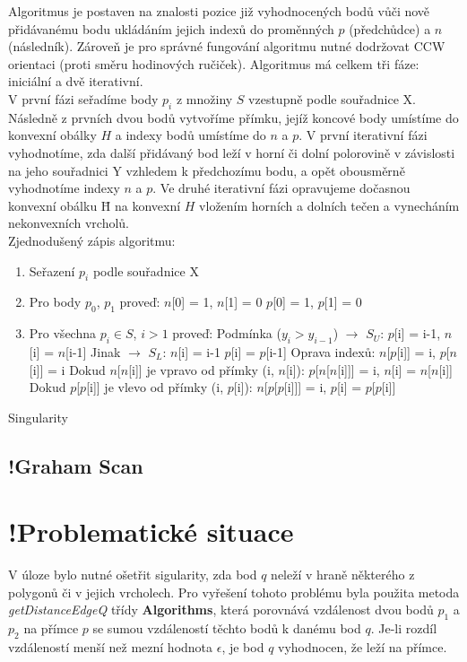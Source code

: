 \documentclass[a4paper, 12pt]{article}
\begin{document}
Algoritmus je postaven na znalosti pozice již vyhodnocených bodů vůči nově přidá\-vanému bodu ukládáním jejich indexů do proměnných $p$ (předchůdce) a $n$ (následník). Zároveň je pro správné fungování algoritmu nutné dodržovat CCW orientaci (proti směru hodinových ručiček). Algoritmus má celkem tři fáze: iniciální a dvě iterativní.\\

V první fázi seřadíme body $p_i$ z množiny $S$ vzestupně podle souřadnice X. Následně z prvních dvou bodů vytvoříme přímku, jejíž koncové body umístíme do konvexní obálky $H$ a indexy bodů umístíme do $n$ a $p$. V první iterativní fázi vyhodnotíme, zda další přidávaný bod leží v horní či dolní polorovině v závislosti na jeho souřadnici Y vzhledem k předchozímu bodu, a opět obousměrně vyhodnotíme indexy $n$ a $p$. Ve druhé iterativní fázi opravujeme dočasnou konvexní obálku \={H} na konvexní $H$ vložením horních a dolních tečen a vynecháním nekonvexních vrcholů.\\

Zjednodušený zápis algoritmu: 
\begin{enumerate}
\item Seřazení $p_i$ podle souřadnice X
\item Pro body $p_0$, $p_1$ proveď:
\subitem $n$[0] = 1, $n$[1] = 0
\subitem $p$[0] = 1, $p$[1] = 0
\item Pro všechna $p_i \in S$, $i > 1$ proveď:
\subitem Podmínka ($y_i > y_{i-1}$) $\rightarrow$ $S_U$: $p$[i] = i-1, $n$[i] = $n$[i-1]
\subitem Jinak $\rightarrow$ $S_L$: $n$[i] = i-1 $p$[i] = $p$[i-1]
\subitem Oprava indexů: $n$[$p$[i]] = i, $p$[$n$[i]] = i
\subitem Dokud $n$[$n$[i]] je vpravo od přímky (i, $n$[i]):
\subsubitem $p$[$n$[$n$[i]]] = i, $n$[i] = $n$[$n$[i]]
\subitem Dokud $p$[$p$[i]] je vlevo od přímky (i, $p$[i]):
\subsubitem $n$[$p$[$p$[i]]] = i, $p$[i] = $p$[$p$[i]]
\end{enumerate}

Singularity

\subsection{!Graham Scan}

\section{!Problematické situace}
V úloze bylo nutné ošetřit sigularity, zda bod $q$ neleží v hraně některého z polygonů či v jejich vrcholech. Pro vyřešení tohoto problému byla použita metoda \textit{getDistanceEdgeQ} třídy \textbf{Algorithms}, která porovnává vzdálenost dvou bodů $p_1$ a $p_2$ na přímce $p$ se sumou vzdáleností těchto bodů k danému bod $q$. Je-li rozdíl vzdáleností menší než mezní hodnota $\epsilon$, je bod $q$ vyhodnocen, že leží na přímce.\\
\end{document}
